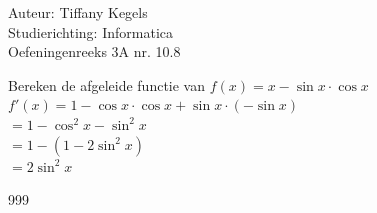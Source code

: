 \documentclass[a4paper]{article}
\begin{document}
  
\noindent \large Auteur: Tiffany Kegels \\
\noindent \large Studierichting: Informatica\\
\noindent \large Oefeningenreeks 3A nr. 10.8\\

\medskip

\normalsize

Bereken de afgeleide functie van $f(x) = x - \sin x \cdot \cos x$\\

$f'(x) =1 -  \cos x \cdot \cos x + \sin x \cdot (-\sin x)$\\

$= 1 - \cos^2x -\sin^2x$\\

$= 1 - (1 - 2\sin^2x)$\\

$= 2\sin^2x$\\

\begin{thebibliography}{999}

\end{thebibliography}
\end{document}
